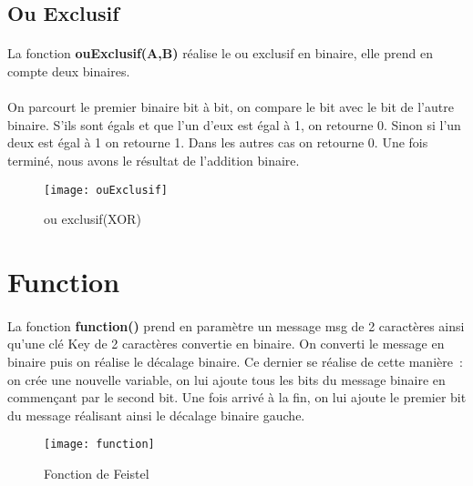 \documentclass[11pt,fleqn]{book} %
\begin{document}

\subsection{Ou Exclusif}

\paragraph{}La fonction \textbf{ouExclusif(A,B)} réalise le ou exclusif en binaire, elle prend en compte deux binaires.
\\\\On parcourt le premier binaire bit à bit, on compare le bit avec le bit de l'autre binaire. S'ils sont égals et que l'un d'eux est égal à 1, on retourne 0. Sinon si l'un deux est égal à 1 on retourne 1. Dans les autres cas on retourne 0. Une fois terminé, nous avons le résultat de l'addition binaire.

\begin{figure}[!h]
\centering\texttt{[image: ouExclusif]}
\caption{ou exclusif(XOR)}
\end{figure}


\section{Function}

\paragraph{}La fonction \textbf{function()} prend en paramètre un message msg de 2 caractères ainsi qu'une clé Key de 2 caractères convertie en binaire. On converti le message en binaire puis on réalise le décalage binaire. Ce dernier se réalise de cette manière : on crée une nouvelle variable, on lui ajoute tous les bits du message binaire en commençant par le second bit. Une fois arrivé à la fin, on lui ajoute le premier bit du message réalisant ainsi le décalage binaire gauche.

\begin{figure}[!h]
\centering\texttt{[image: function]}
\caption{Fonction de Feistel}
\end{figure}

\end{document}
